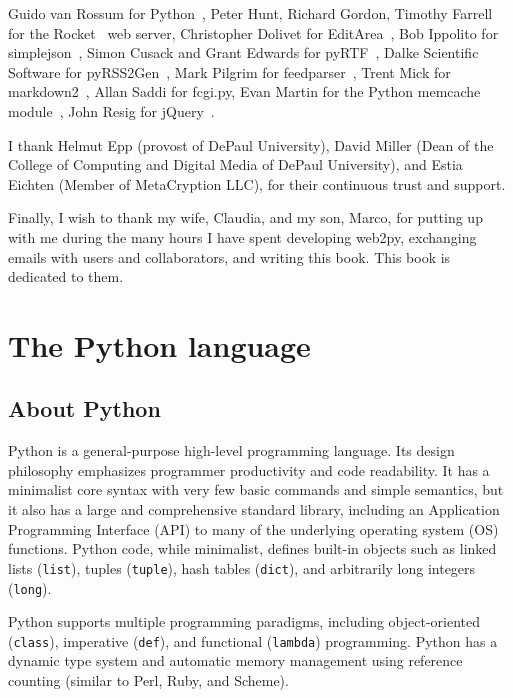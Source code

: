 \documentclass[justified,sixbynine,notoc]{tufte-book}
\def\ft{\small\tt}
\def\inxx#1{\index{#1}}
\begin{document}
\begin{fullwidth}
Guido van Rossum for Python~\cite{python}, Peter Hunt, Richard Gordon, Timothy Farrell for the Rocket~\cite{rocket}  web server, Christopher Dolivet for EditArea~\cite{editarea}, Bob Ippolito for simplejson~\cite{simplejson}, Simon Cusack and Grant Edwards for pyRTF~\cite{pyrtf}, Dalke Scientific Software for pyRSS2Gen~\cite{pyrss2gen}, Mark Pilgrim for feedparser~\cite{feedparser}, Trent Mick for markdown2~\cite{markdown2}, Allan Saddi for fcgi.py, Evan Martin for the Python memcache module~\cite{memcache}, John Resig for jQuery~\cite{jquery}.

I thank Helmut Epp (provost of DePaul University), David Miller (Dean of the College of Computing and Digital Media of DePaul University), and Estia Eichten (Member of MetaCryption LLC), for their continuous trust and support.

Finally, I wish to thank my wife, Claudia, and my son, Marco, for putting up with me during the many hours I have spent developing web2py, exchanging emails with users and collaborators, and writing this book. This book is dedicated to them.

\goodbreak\chapter{The Python language}

\inxx{Python}

\goodbreak\section{About Python}

Python is a general-purpose high-level programming language.
Its design philosophy emphasizes programmer productivity and code readability. It has a minimalist core syntax with very few basic commands and simple semantics, but it also has a large and comprehensive standard library, including an Application Programming Interface (API) \inxx{API} to many of the underlying operating system (OS) functions. Python code, while minimalist, defines built-in objects such as linked lists ({\ft list}), tuples ({\ft tuple}), hash tables ({\ft dict}), and arbitrarily long integers ({\ft long}).

Python supports multiple programming paradigms, including object-oriented ({\ft class}), imperative ({\ft def}), and functional ({\ft lambda}) programming. Python has a dynamic type system and automatic memory management using reference counting (similar to Perl, Ruby, and Scheme).


\end{fullwidth}
\end{document}
